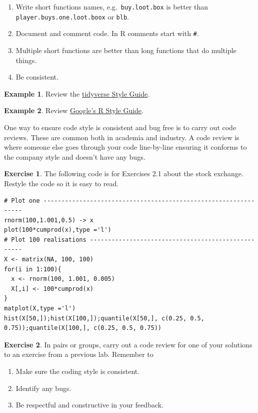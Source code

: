 \documentclass[
]{book}
\providecommand{\tightlist}{%
  \setlength{\itemsep}{0pt}\setlength{\parskip}{0pt}}
\theoremstyle{definition}
\theoremstyle{definition}
\newtheorem{example}{Example}[chapter]
\theoremstyle{definition}
\newtheorem{exercise}{Exercise}[chapter]
\theoremstyle{definition}
\theoremstyle{remark}
\begin{document}
\begin{enumerate}
\def\labelenumi{\arabic{enumi}.}
\tightlist
\item
  Write short functions names, e.g.~\texttt{buy.loot.box} is better than \texttt{player.buys.one.loot.boox} or \texttt{blb}.
\item
  Document and comment code. In R comments start with \texttt{\#}.
\item
  Multiple short functions are better than long functions that do multiple things.
\item
  Be consistent.
\end{enumerate}

\begin{example}
Review the \href{https://style.tidyverse.org/index.html}{tidyverse Style Guide}.
\end{example}

\begin{example}
Review \href{https://google.github.io/styleguide/Rguide.html}{Google's R Style Guide}.
\end{example}

One way to ensure code style is consistent and bug free is to carry out code reviews. These are common both in academia and industry. A code review is where someone else goes through your code line-by-line ensuring it conforms to the company style and doesn't have any bugs.

\begin{exercise}

The following code is for Exercises 2.1 about the stock exchange. Restyle the code so it is easy to read.

\begin{verbatim}
# Plot one ----------------------------------------------------------------
rnorm(100,1.001,0.5) -> x 
plot(100*cumprod(x),type ='l') 
# Plot 100 realisations ---------------------------------------------------
X <- matrix(NA, 100, 100) 
for(i in 1:100){
  x <- rnorm(100, 1.001, 0.005)
  X[,i] <- 100*cumprod(x)
}
matplot(X,type ='l')
hist(X[50,]);hist(X[100,]);quantile(X[50,], c(0.25, 0.5, 0.75));quantile(X[100,], c(0.25, 0.5, 0.75))
\end{verbatim}

\end{exercise}

\begin{exercise}

In pairs or groups, carry out a code review for one of your solutions to an exercise from a previous lab. Remember to

\begin{enumerate}
\def\labelenumi{\arabic{enumi}.}
\tightlist
\item
  Make sure the coding style is consistent.
\item
  Identify any bugs.
\item
  Be respectful and constructive in your feedback.
\end{enumerate}

\end{exercise}
\end{document}
